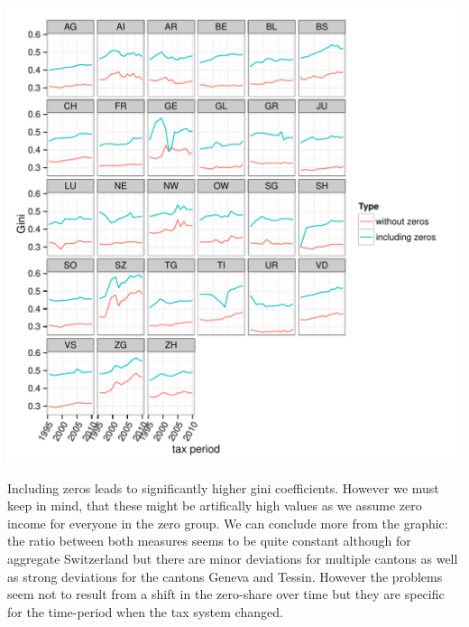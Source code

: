 \documentclass[twoside]{article}\usepackage[]{graphicx}\usepackage[]{color}
\makeatletter
\def\maxwidth{ %
  \ifdim\Gin@nat@width>\linewidth
    \linewidth
  \else
    \Gin@nat@width
  \fi
}
\newenvironment{knitrout}{}{} %
\makeatother
\begin{document}
\begin{multicols}{2}
\begin{knitrout}
\includegraphics[width=\maxwidth]{figure/with_without_zeros2} 

\end{knitrout}


Including zeros leads to significantly higher gini coefficients. However we must keep in mind, that these might be artifically high values as we assume zero income for everyone in the zero group. We can conclude more from the graphic: the ratio between both measures seems to be quite constant although for aggregate Switzerland but there are minor deviations for multiple cantons as well as strong deviations for the cantons Geneva and Tessin. However the problems seem not to result from a shift in the zero-share over time but they are specific for the time-period when the tax system changed. 



\end{multicols}
\end{document}
